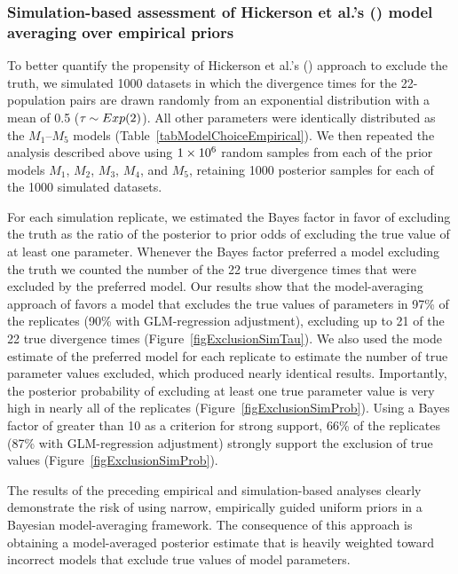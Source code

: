 

\subsubsection{Simulation-based assessment of Hickerson et al.'s
    (\citeyear{Hickerson2013}) model averaging over empirical priors}

To better quantify the propensity of Hickerson et al.'s
(\citeyear{Hickerson2013}) approach to exclude the truth, we simulated 1000
datasets in which the divergence times for the 22-population pairs are drawn
randomly from an exponential distribution with a mean of 0.5 ($\tau_{} \sim
Exp(2)$).
All other parameters were identically distributed as the $M_1$--$M_5$ models
(Table~\ref{tabModelChoiceEmpirical}).
We then repeated the analysis described above using $1\times 10^{6}$ random samples from
each of the prior models $M_1$, $M_2$, $M_3$, $M_4$, and $M_5$, retaining 1000
posterior samples for each of the 1000 simulated datasets.

For each simulation replicate, we estimated the Bayes factor in favor
of excluding the truth as the ratio of the posterior to prior odds of
excluding the true value of at least one parameter.
Whenever the Bayes factor preferred a model excluding the truth we counted the
number of the 22 true divergence times that were excluded by the preferred
model.
Our results show that the model-averaging approach of \citet{Hickerson2013}
favors a model that excludes the true values of parameters in 97\% of the
replicates (90\% with GLM-regression adjustment), excluding up to 21 of the 22
true divergence times (Figure~\ref{figExclusionSimTau}).
We also used the mode estimate of the preferred model for each replicate to
estimate the number of true parameter values excluded, which produced nearly
identical results.
Importantly, the posterior probability of excluding at least one true parameter
value is very high in nearly all of the replicates
(Figure~\ref{figExclusionSimProb}).
Using a Bayes factor of greater than 10 as a criterion for strong support, 66\%
of the replicates (87\% with GLM-regression adjustment) strongly support the
exclusion of true values (Figure~\ref{figExclusionSimProb}).

The results of the preceding empirical and simulation-based analyses clearly
demonstrate the risk of using narrow, empirically guided uniform priors in a
Bayesian model-averaging framework.
The consequence of this approach is obtaining a model-averaged posterior
estimate that is heavily weighted toward incorrect models that exclude true
values of model parameters.


